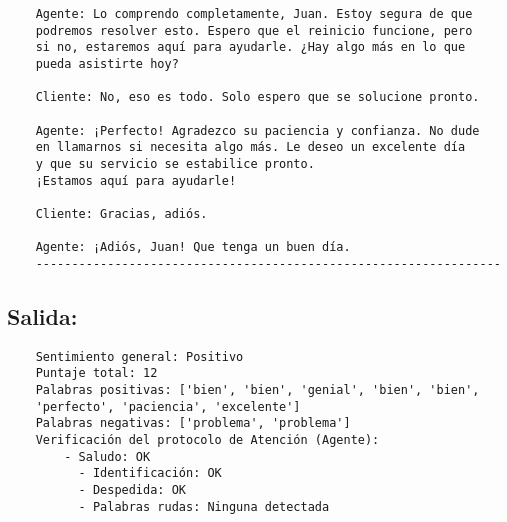 \begin{verbatim}
    Agente: Lo comprendo completamente, Juan. Estoy segura de que 
    podremos resolver esto. Espero que el reinicio funcione, pero 
    si no, estaremos aquí para ayudarle. ¿Hay algo más en lo que 
    pueda asistirte hoy?

    Cliente: No, eso es todo. Solo espero que se solucione pronto.

    Agente: ¡Perfecto! Agradezco su paciencia y confianza. No dude 
    en llamarnos si necesita algo más. Le deseo un excelente día 
    y que su servicio se estabilice pronto. 
    ¡Estamos aquí para ayudarle!

    Cliente: Gracias, adiós.

    Agente: ¡Adiós, Juan! Que tenga un buen día.
    ----------------------------------------------------------------- 
    \end{verbatim}

\subsection*{Salida:}
\begin{tcolorbox}[colback=gray!10, colframe=gray!80, sharp corners, boxrule=0.5pt]
	\begin{verbatim}
    Sentimiento general: Positivo
    Puntaje total: 12
    Palabras positivas: ['bien', 'bien', 'genial', 'bien', 'bien', 
    'perfecto', 'paciencia', 'excelente']
    Palabras negativas: ['problema', 'problema']
    Verificación del protocolo de Atención (Agente):
        - Saludo: OK
          - Identificación: OK
          - Despedida: OK
          - Palabras rudas: Ninguna detectada
          \end{verbatim}
\end{tcolorbox}
